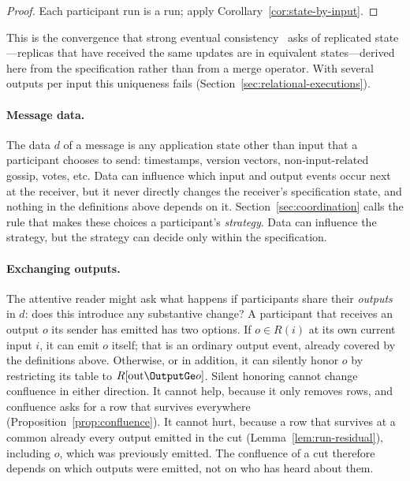 \begin{proof}
Each participant run is a run; apply Corollary~\ref{cor:state-by-input}.
\end{proof}

This is the convergence that strong eventual
consistency~\cite{shapiro2011crdt} asks of replicated state---replicas that
have received the same updates are in equivalent states---derived here from
the specification rather than from a merge operator.  With several outputs per
input this uniqueness fails (Section~\ref{sec:relational-executions}).

\paragraph{Message data.}
The data $d$ of a message is any application state other than input that a
participant chooses to send: timestamps, version vectors, non-input-related gossip, votes, etc.  Data
can influence which input and output events occur next at the receiver, but it
never directly changes the receiver's specification state, and nothing in the
definitions above depends on it.  Section~\ref{sec:coordination} calls the
rule that makes these choices a participant's \emph{strategy}.  Data can
influence the strategy, but the strategy can decide only within the
specification.

\paragraph{Exchanging outputs.}
The attentive reader might ask what happens if participants share their \emph{outputs} in
$d$: does this introduce any substantive change?  A participant that receives an
output $o$ its sender has emitted has two
options.  If $o\in R(i)$ at its own current input $i$, it can emit $o$ itself;
that is an ordinary output event, already covered by the definitions above.
Otherwise, or in addition, it can silently honor $o$ by restricting its table
to $R[\mathrm{out}\OutputGe o]$.  Silent honoring cannot change confluence in either direction.  It cannot
help, because it only removes rows, and confluence asks for a row that
survives everywhere (Proposition~\ref{prop:confluence}).  It cannot hurt,
because a row that survives at a common \indesc already \outrel every output
emitted in the cut (Lemma~\ref{lem:run-residual}), including $o$, which was previously emitted.
The confluence of a cut therefore depends on which outputs were emitted,
not on who has heard about them.
